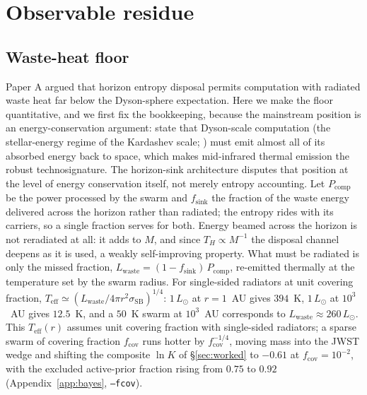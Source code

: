 \documentclass[11pt]{article}
\newcommand{\lnK}{\ensuremath{\ln K}}
\begin{document}
\section{Observable residue}
\label{sec:residue}

\subsection{Waste-heat floor}
\label{sec:wasteheat}

Paper A argued that horizon entropy disposal permits computation with radiated waste heat far below the Dyson-sphere expectation. Here we make the floor quantitative, and we first fix the bookkeeping, because the mainstream position is an energy-conservation argument: \citet{Curtis2026DysonMinds} state that Dyson-scale computation (the stellar-energy regime of the Kardashev scale; \citealt{Kardashev1964}) must emit almost all of its absorbed energy back to space, which makes mid-infrared thermal emission the robust technosignature. The horizon-sink architecture disputes that position at the level of energy conservation itself, not merely entropy accounting. Let $P_{\mathrm{comp}}$ be the power processed by the swarm and $f_{\mathrm{sink}}$ the fraction of the waste energy delivered across the horizon rather than radiated; the entropy rides with its carriers, so a single fraction serves for both. Energy beamed across the horizon is not reradiated at all: it adds to $M$, and since $T_{H} \propto M^{-1}$ the disposal channel deepens as it is used, a weakly self-improving property. What must be radiated is only the missed fraction, $L_{\mathrm{waste}} = (1 - f_{\mathrm{sink}})\,P_{\mathrm{comp}}$, re-emitted thermally at the temperature set by the swarm radius. For single-sided radiators at unit covering fraction, $T_{\mathrm{eff}} \simeq (L_{\mathrm{waste}}/4\pi r^{2}\sigma_{\mathrm{SB}})^{1/4}$: $1\,L_{\odot}$ at $r = 1$~AU gives $394$~K, $1\,L_{\odot}$ at $10^{3}$~AU gives $12.5$~K, and a $50$~K swarm at $10^{3}$~AU corresponds to $L_{\mathrm{waste}} \approx 260\,L_{\odot}$. This $T_{\mathrm{eff}}(r)$ assumes unit covering fraction with single-sided radiators; a sparse swarm of covering fraction
$f_{\mathrm{cov}}$ runs hotter by $f_{\mathrm{cov}}^{-1/4}$, moving mass into
the JWST wedge and shifting the composite $\lnK$ of \S\ref{sec:worked} to
$-0.61$ at $f_{\mathrm{cov}} = 10^{-2}$, with the excluded active-prior
fraction rising from $0.75$ to $0.92$ (Appendix~\ref{app:bayes},
\texttt{--fcov}).
\end{document}

